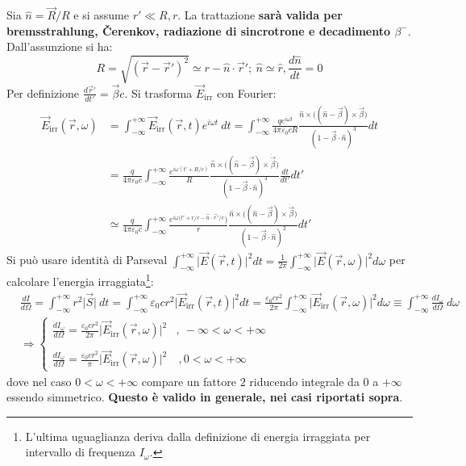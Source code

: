 \documentclass[10pt, a4paper]{scrartcl}
\numberwithin{equation}{subsection}
\theoremstyle{style1}
\begin{document}
Sia $\hat{n} = \vec{R}/R$ e si assume $r' \ll R , r$. La trattazione \textbf{sar\`a valida per bremsstrahlung, \v Cerenkov, radiazione di sincrotrone e decadimento $\beta ^-$}. Dall'assunzione si ha:
\[
R = \sqrt{(\vec{r}-\vec{r}')^2} \simeq r - \hat{n}\cdot \vec{r}'; \ \hat{n} \simeq \hat{r}, \frac{d \hat{n}}{d t} = 0
\] 
Per definizione $\frac{d \vec{r}'}{d t'} = \vec{\beta }c$. Si trasforma $\vec{E}_\text{irr}$ con Fourier:
\begin{equation}
	\begin{split}
		\vec{E}_\text{irr}(\vec{r},\omega)&= \int_{-\infty} ^{+\infty} \vec{E}_{\text{irr}} (\vec{r},t) e^{i\omega t} \ dt =\int_{-\infty} ^{+\infty} \frac{qe^{i\omega t} }{4\pi \varepsilon _0 c R}\frac{\hat{n}\times \big((\hat{n}-\vec{\beta }) \times \dot{ \vec{\beta }}\big)}{(1- \vec{\beta }\cdot \hat{n})^3} dt\\
						  &=\frac{q}{4\pi \varepsilon _0 c} \int_{-\infty} ^{+\infty} \frac{e^{i\omega (t' + R / c)} }{R} \frac{\hat{n}\times \big((\hat{n}-\vec{\beta }) \times \dot{\vec{\beta }}\big)}{(1-\vec{\beta }\cdot \hat{n})^3} \frac{d t}{d t'} dt'\\
						  &\simeq \frac{q}{4\pi \varepsilon _0 c} \int_{-\infty} ^{+\infty}  \frac{e^{i\omega(t' + r / c - \hat{n}\cdot \vec{r}' / c} )}{r} \frac{\hat{n}\times \big((\hat{n}-\vec{\beta }) \times \dot{\vec{\beta }}\big)}{(1-\vec{\beta }\cdot \hat{n})^2}dt'
	\end{split}
\end{equation}
Si pu\`o usare identit\`a di Parseval $\int_{-\infty} ^{+\infty} \lvert \vec{E}(\vec{r},t) \rvert ^2  dt=\frac{1}{2\pi} \int_{-\infty} ^{+\infty} \lvert \vec{E}(\vec{r},\omega) \rvert ^2  d\omega$ per calcolare l'energia irraggiata\footnote{L'ultima uguaglianza deriva dalla definizione di energia irraggiata per intervallo di frequenza $I_\omega$.}:
\begin{equation}
	\begin{split}
		&\frac{d I}{d \Omega } = \int_{-\infty} ^{+\infty} r^2 \lvert \vec{S} \rvert \ dt = \int_{-\infty} ^{+\infty} \varepsilon _0 cr^2 \lvert \vec{E}_\text{irr}(\vec{r},t) \rvert ^2 dt = \frac{\varepsilon _0 cr^2}{2\pi} \int_{-\infty} ^{+\infty} \lvert \vec{E}_\text{irr}(\vec{r},\omega) \rvert ^2 d\omega \equiv \int_{-\infty} ^{+\infty} \frac{d I_\omega}{d \Omega } \ d\omega\\
		&\Rightarrow \begin{cases}
			\displaystyle \frac{d I_\omega}{d \Omega } = \frac{\varepsilon _0 cr^2}{2\pi} \lvert \vec{E}_\text{irr}(\vec{r},\omega) \rvert ^2 & ,\ -\infty<\omega <+\infty\\
			\\
			\displaystyle \frac{d I_\omega}{d \Omega }  = \frac{\varepsilon _0 cr^2}{\pi} \lvert \vec{E}_\text{irr}(\vec{r},\omega) \rvert ^2& \ , 0<\omega < +\infty	
		\end{cases}
	\end{split}
\end{equation}
dove nel caso $0 < \omega<+\infty$ compare un fattore $2$ riducendo integrale da $0$ a $+\infty$ essendo simmetrico. \textbf{Questo \`e valido in generale, nei casi riportati sopra}.
\end{document}
